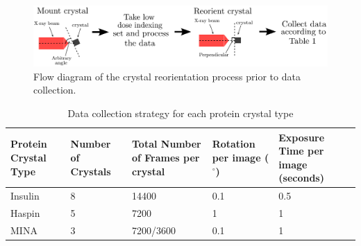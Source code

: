 \begin{figure}
  \centering
    \includegraphics[width=1\textwidth]{figures/dwd/initial_indexing.pdf}
    \caption{Flow diagram of the crystal reorientation process prior to data collection.}
    \label{fig: indexing flow diagram}
\end{figure}

\begin{table}[ht!]
	\caption{Data collection strategy for each protein crystal type}
	\centering
	\begin{tabular}{p{2.3cm} p{2.0cm} p{2.6cm} p{2.3cm} p{3.5cm}}
		\hline
		Protein Crystal Type & Number of Crystals & Total Number of Frames per crystal & Rotation per image ($^\circ$) & Exposure Time per image (seconds) \\
		\hline
		Insulin      & 8   & 14400  		& 0.1 & 0.5  \\
		Haspin       & 5   & 7200   		& 1 	& 1  	 \\
		MINA         & 3   & 7200/3600  & 0.1 & 1    \\
		\hline
	\end{tabular}
	\label{tab:Hamburg data collection}
\end{table}

